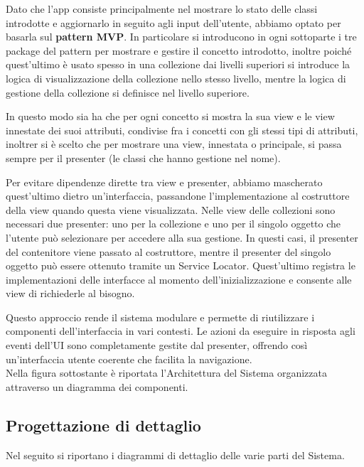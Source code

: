 \documentclass[a4paper, 11pt]{article}
\begin{document}
Dato che l’app consiste principalmente nel mostrare lo stato delle classi introdotte e aggiornarlo in seguito agli input dell’utente, abbiamo optato per basarla sul \textbf{pattern MVP}. In particolare si introducono in ogni sottoparte i tre package del pattern per mostrare e gestire il concetto introdotto, inoltre poiché quest’ultimo è usato spesso in una collezione dai livelli superiori si introduce la logica di visualizzazione della collezione nello stesso livello, mentre la logica di gestione della collezione si definisce nel livello superiore. 

In questo modo sia ha che per ogni concetto si mostra la sua view e le view innestate dei suoi attributi, condivise fra i concetti con gli stessi tipi di attributi, inoltrer si è scelto che per mostrare una view, innestata o principale, si passa sempre per il presenter (le classi che hanno gestione nel nome).

Per evitare dipendenze dirette tra view e presenter, abbiamo mascherato quest’ultimo dietro un’interfaccia, passandone l’implementazione al costruttore della view quando questa viene visualizzata. Nelle view delle collezioni sono necessari due presenter: uno per la collezione e uno per il singolo oggetto che l’utente può selezionare per accedere alla sua gestione. In questi casi, il presenter del contenitore viene passato al costruttore, mentre il presenter del singolo oggetto può essere ottenuto tramite un Service Locator. Quest’ultimo registra le implementazioni delle interfacce al momento dell’inizializzazione e consente alle view di richiederle al bisogno.

Questo approccio rende il sistema modulare e permette di riutilizzare i componenti dell’interfaccia in vari contesti. Le azioni da eseguire in risposta agli eventi dell’UI sono completamente gestite dal presenter, offrendo così un’interfaccia utente coerente che facilita la navigazione.
\\ 

Nella figura sottostante è riportata l’Architettura del Sistema organizzata attraverso un diagramma dei componenti.
\begin{figure}[h!]
\end{figure}

\newpage
\subsection{Progettazione di dettaglio}
Nel seguito si riportano i diagrammi di dettaglio delle varie parti del Sistema.
\end{document}
